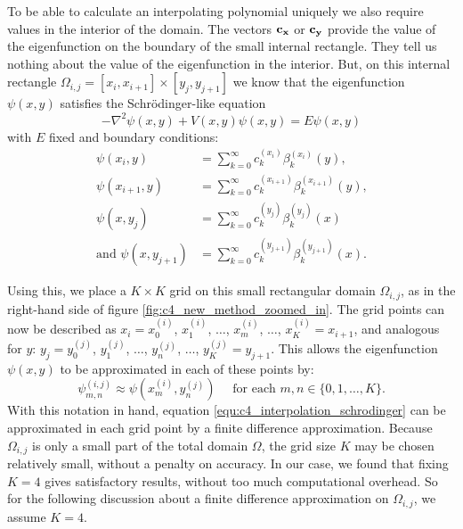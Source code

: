 To be able to calculate an interpolating polynomial uniquely we also require values in the interior of the domain. The vectors $\vb{c_x}$ or $\vb{c_y}$ provide the value of the eigenfunction on the boundary of the small internal rectangle. They tell us nothing about the value of the eigenfunction in the interior. But, on this internal rectangle $\Omega_{i, j} = [x_i, x_{i+1}] \times [y_j, y_{j+1}]$ we know that the eigenfunction $\psi(x, y)$ satisfies the Schrödinger-like equation
\begin{equation}\label{equ:c4_interpolation_schrodinger}
    -\nabla^2 \psi(x, y) + V(x, y) \psi(x, y) = E \psi(x, y)
\end{equation}
with $E$ fixed and boundary conditions:
\begin{align*}
    \psi(x_i, y)                 & = \sum_{k=0}^\infty c_k^{(x_i)} \beta_k^{(x_i)}(y)\text{,}          \\
    \psi(x_{i+1}, y)             & = \sum_{k=0}^\infty c_k^{(x_{i+1})} \beta_k^{(x_{i+1})}(y)\text{,}  \\
    \psi(x, y_j)                 & = \sum_{k=0}^\infty c_k^{(y_j)} \beta_k^{(y_j)}(x)                  \\
    \text{and } \psi(x, y_{j+1}) & = \sum_{k=0}^\infty c_k^{(y_{j+1})} \beta_k^{(y_{j+1})}(x) \text{.}
\end{align*}

Using this, we place a $K \times K$ grid on this small rectangular domain $\Omega_{i, j}$, as in the right-hand side of figure \ref{fig:c4_new_method_zoomed_in}. The grid points can now be described as $x_i = x^{(i)}_0$, $x^{(i)}_1$, $\dots$, $x^{(i)}_m$, $\dots$, $x^{(i)}_K = x_{i+1}$, and analogous for $y$: $y_j = y^{(j)}_0$, $y^{(j)}_1$, $\dots$, $y^{(j)}_n$, $\dots$, $y^{(j)}_K = y_{j+1}$. This allows the eigenfunction $\psi(x, y)$ to be approximated in each of these points by:
$$
    \psi^{(i,j)}_{m,n} \approx \psi(x^{(i)}_m, y^{(j)}_n) \quad \text{ for each $m, n \in \{0, 1, \dots, K\}$.}
$$
With this notation in hand, equation \ref{equ:c4_interpolation_schrodinger} can be approximated in each grid point by a finite difference approximation. Because $\Omega_{i,j}$ is only a small part of the total domain $\Omega$, the grid size $K$ may be chosen relatively small, without a penalty on accuracy. In our case, we found that fixing $K = 4$ gives satisfactory results, without too much computational overhead. So for the following discussion about a finite difference approximation on $\Omega_{i,j}$, we assume $K = 4$.


